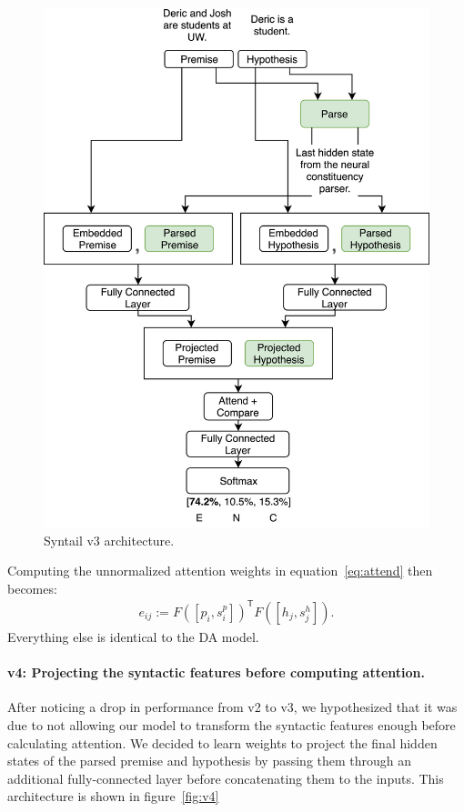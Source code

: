 \documentclass[11pt,a4paper]{article}
\begin{document}
\begin{figure}[h]
    \centering
    \includegraphics[width=\linewidth]{figures/v3.png}
    \caption{Syntail v3 architecture.}
\label{fig:v3}
\end{figure}

Computing the unnormalized attention weights in equation~\ref{eq:attend} then becomes:
\begin{align}
    e_{ij} := F([p_i, s^p_i])^\mathsf{T} F([h_j, s^h_j]).
\end{align}
Everything else is identical to the DA model.

\paragraph{v4: Projecting the syntactic features before computing attention.}
After noticing a drop in performance from v2 to v3, we hypothesized that it was
due to not allowing our model to transform the syntactic features enough before
calculating attention.
We decided to learn weights to project the final hidden states of the parsed
premise and hypothesis by passing them through an additional fully-connected layer before 
concatenating them to the inputs. This architecture is shown in figure~\ref{fig:v4}
\end{document}
